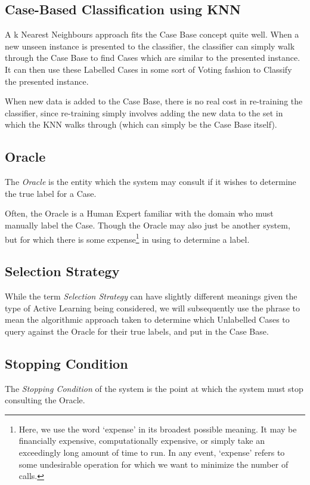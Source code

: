 \documentclass[a4paper,11pt]{report}
\begin{document}
\subsection{Case-Based Classification using KNN}

A k Nearest Neighbours approach fits the Case Base concept quite well. When a new unseen instance is presented to the classifier, the classifier can simply walk through the Case Base to find Cases which are similar to the presented instance. It can then use these Labelled Cases in some sort of Voting fashion to Classify the presented instance.

When new data is added to the Case Base, there is no real cost in re-training the classifier, since re-training simply involves adding the new data to the set in which the KNN walks through (which can simply be the Case Base itself).

\subsection{Oracle}
The \emph{Oracle} is the entity which the system may consult if it wishes to determine the true label for a Case.

Often, the Oracle is a Human Expert familiar with the domain who must manually label the Case. Though the Oracle may also just be another system, but for which there is some expense\footnote{Here, we use the word `expense' in its broadest possible meaning. It may be financially expensive, computationally expensive, or simply take an exceedingly long amount of time to run. In any event, `expense' refers to some undesirable operation for which we want to minimize the number of calls.} in using to determine a label. 

\subsection{Selection Strategy}
While the term \emph{Selection Strategy} can have slightly different meanings given the type of Active Learning being considered, we will subsequently use the phrase to mean the algorithmic approach taken to determine which Unlabelled Cases to query against the Oracle for their true labels, and put in the Case Base.

\subsection{Stopping Condition}
The \emph{Stopping Condition} of the system is the point at which the system must stop consulting the Oracle.
\end{document}
